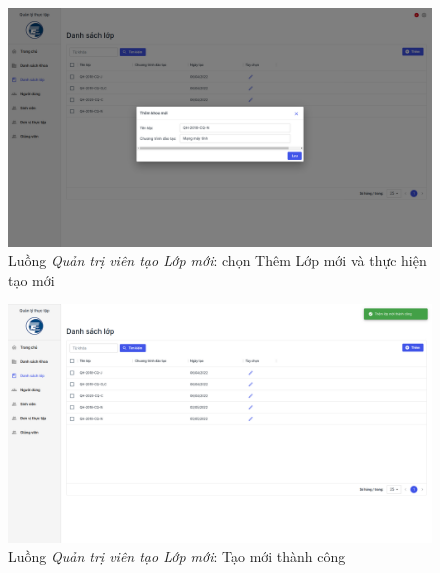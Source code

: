 \documentclass[./../main.tex]{subfiles}
\begin{document}
\begin{figure}[]
	\includegraphics[width=\linewidth]{./images/image60.png}
	\caption{Luồng \emph{Quản trị viên tạo Lớp mới}: chọn Thêm Lớp mới và thực hiện tạo mới}
	\label{fig:admin_add_class}
\end{figure}

\begin{figure}[]
	\includegraphics[width=\linewidth]{./images/image61.png}
	\caption{Luồng \emph{Quản trị viên tạo Lớp mới}: Tạo mới thành công}
	\label{fig:admin_add_class_success}
\end{figure}
\end{document}
